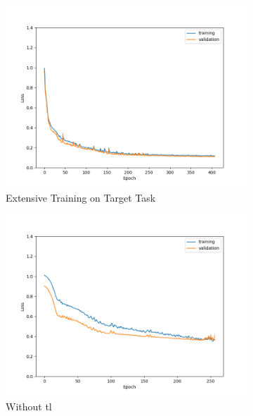 \begin{figure}[ht!]
    \centering
    \begin{subfigure}{0.48\textwidth}
        \includegraphics[width=\textwidth]{./project3/figures/figure4a.png}
        \caption{Extensive Training on Target Task} 
        \label{subfig3-4:extensive}
    \end{subfigure}\hfill
    \begin{subfigure}{0.48\textwidth}
        \includegraphics[width=\textwidth]{./project3/figures/figure4b.png}
        \caption{Without \gls{tl}}
        \label{subfig3-4:without}
    \end{subfigure}
    \begin{subfigure}{0.48\textwidth}

\end{subfigure}
\end{figure}
